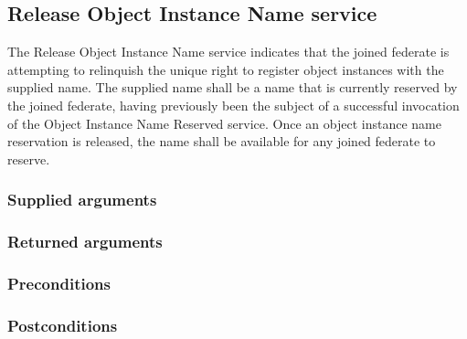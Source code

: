 \begin{compactstdpage}

    \subsection{Release Object Instance Name service}


    The Release Object Instance Name service indicates that the joined federate is attempting to relinquish the unique right to register object instances with the supplied name. The supplied name shall be a name that is currently reserved by the joined federate, having previously been the subject of a successful invocation of the Object Instance Name Reserved \rtiinitiated{} service. Once an object instance name reservation is released, the name shall be available for any joined federate to reserve.

    \subsubsection{Supplied arguments}



    \subsubsection{Returned arguments}



    \subsubsection{Preconditions}



    \subsubsection{Postconditions}



\end{compactstdpage}

